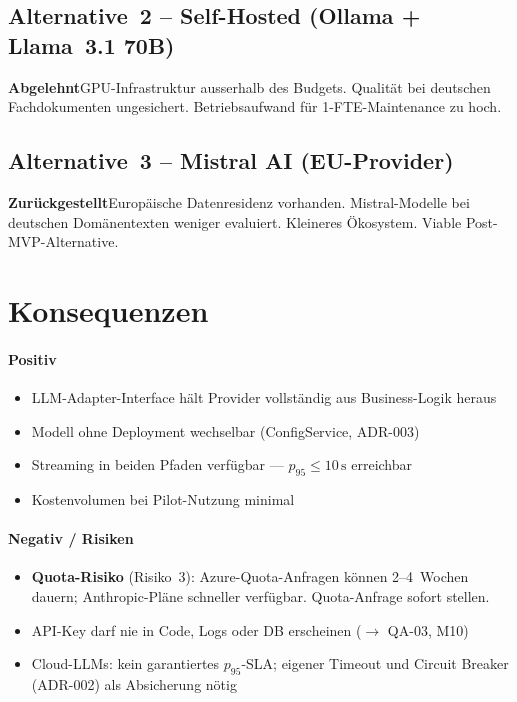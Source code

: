 \documentclass[a4paper, 11pt, oneside]{report}
\newcommand{\ra}{$\rightarrow$\xspace}
\newcommand{\abgelehnt}{\colorbox{depbg}{\small\bfseries\color{warnframe}Abgelehnt}\;}
\newcommand{\zurueckgestellt}{\colorbox{notebg}{\small\bfseries\color{noteframe}Zur\"{u}ckgestellt}\;}
\begin{document}
\subsection{Alternative~2 -- Self-Hosted (Ollama + Llama~3.1 70B)}

\abgelehnt GPU-Infrastruktur ausserhalb des Budgets. Qualität bei deutschen
Fachdokumenten ungesichert. Betriebsaufwand für 1-FTE-Maintenance zu hoch.

\subsection{Alternative~3 -- Mistral AI (EU-Provider)}

\zurueckgestellt Europäische Datenresidenz vorhanden. Mistral-Modelle bei
deutschen Domänentexten weniger evaluiert. Kleineres Ökosystem.
Viable Post-MVP-Alternative.

\section{Konsequenzen}

\paragraph{Positiv}
\begin{itemize}
  \item LLM-Adapter-Interface hält Provider vollständig aus Business-Logik heraus
  \item Modell ohne Deployment wechselbar (ConfigService, ADR-003)
  \item Streaming in beiden Pfaden verfügbar --- $p_{95} \leq 10\,\text{s}$ erreichbar
  \item Kostenvolumen bei Pilot-Nutzung minimal
\end{itemize}

\paragraph{Negativ / Risiken}
\begin{itemize}
  \item \textbf{Quota-Risiko} (Risiko~3): Azure-Quota-Anfragen können 2--4~Wochen
        dauern; Anthropic-Pläne schneller verfügbar. Quota-Anfrage sofort stellen.
  \item API-Key darf nie in Code, Logs oder DB erscheinen (\ra QA-03, M10)
  \item Cloud-LLMs: kein garantiertes $p_{95}$-SLA; eigener Timeout und Circuit
        Breaker (ADR-002) als Absicherung nötig
\end{itemize}
\end{document}
